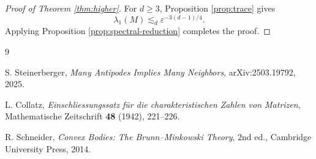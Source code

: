 \documentclass[11pt]{article}
\newcommand{\eps}{\varepsilon}
\begin{document}
\begin{proof}[Proof of Theorem \ref{thm:higher}]
For $d\ge3$, Proposition \ref{prop:trace} gives
\[
   \lambda_1(M)\lesssim_d \eps^{-3(d-1)/4}.
\]
Applying Proposition \ref{prop:spectral-reduction} completes the proof.
\end{proof}

\begin{thebibliography}{9}

S. Steinerberger,
\emph{Many Antipodes Implies Many Neighbors},
arXiv:2503.19792, 2025.

L. Collatz,
\emph{Einschliessungssatz f\"ur die charakteristischen Zahlen von Matrizen},
Mathematische Zeitschrift \textbf{48} (1942), 221--226.

R. Schneider,
\emph{Convex Bodies: The Brunn--Minkowski Theory},
2nd ed., Cambridge University Press, 2014.

\end{thebibliography}
\end{document}
